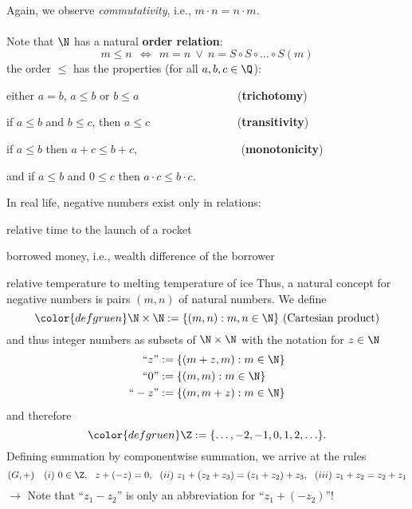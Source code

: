 {\begin{align*}
	\end{align*} 
	Again, we observe  \textit{commutativity}, i.e., {\color{satzrot}$m\cdot n=n\cdot m$}.
	~\\~\\
	Note that $\N$ has a natural \textbf{order relation}:
	\[
	m\le n~~\Leftrightarrow~~ m=n~ \vee~ n= S\circ S\circ \ldots \circ S(m)
	\]
	the order  $\le$ has the properties (for all $a,b,c\in\Q$):
	\ite \color{defgruen}
	\item[i)] either $a=b$, $a \le b$ or $b\le a$ ~~~~~~~~~~~~~~~~~(\textbf{trichotomy})
	\item[ii)] if $a\le b$ and $b\le c$, then $a\le c$ ~~~~~~~~~~~~~~~(\textbf{transitivity})
	\item[iii)]  if $a\le b$ then $a+c\le b+c$, ~~~~~~~~~~~~~~~~~~(\textbf{monotonicity})
	\item[] and if $a\le b$ and $0\le c$ then $a\cdot c\le b\cdot c$.
	\eti
	
	In real life, negative numbers exist only in relations:
	\ite
	\item relative time to the launch of a rocket\\[-0.8cm]
	\item borrowed money, i.e., wealth difference of the borrower\\[-0.8cm]
	\item relative temperature to melting temperature of ice
	\eti
	Thus, a natural concept for negative numbers is pairs $(m,n)$ of natural numbers. We define
	\[ \color{defgruen}
	\N\times\N :=\{(m,n): m,n\in\N\} \text{ (Cartesian product)}
	\]
	and thus integer numbers as subsets of $\N\times\N$ with the notation for $z\in\N$
	\color{defgruen}
	\begin{align*}
	\text{``}z\text{''} &:= \{(m+z,m): m\in\N\}\\
	\text{``}0\text{''} &:= \{(m,m): m\in\N\}\\
	\text{``}-z\text{''} &:= \{(m,m+z): m\in\N\}
	\end{align*}
	\color{black}
	and therefore $$\color{defgruen}\Z:=\{\ldots ,-2,-1,0,1,2,\ldots\}.$$
	Defining summation by componentwise summation, we arrive at the rules
	{\color{satzrot}
		\[
		(G,+)~~~ (i)~0\in\Z,~~ z+(-z)=0,~~ (ii)~z_1+(z_2+z_3)=(z_1+z_2)+z_3,~~ (iii)~z_1+z_2=z_2+z_1
		\]
		$\rightarrow$ Note that ``$z_1-z_2$'' is only an abbreviation for ``$z_1+(-z_2)$''!}
	
}
